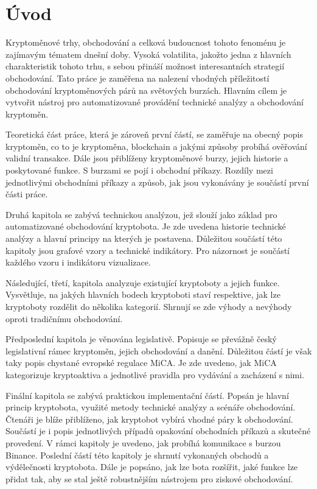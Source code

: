 \chapter{Úvod}
\label{sec:Introduction}
Kryptoměnové trhy, obchodování a celková budoucnost tohoto fenoménu je zajímavým tématem dnešní doby. Vysoká volatilita, jakožto jedna z hlavních charakteristik tohoto trhu, s sebou přináší
možnost interesantních strategií obchodování. Tato práce je zaměřena na nalezení vhodných příležitostí obchodování kryptoměnových párů na světových burzách. Hlavním cílem
je vytvořit nástroj pro automatizované provádění technické analýzy a obchodování kryptoměn.

Teoretická část práce, která je zároveň první částí, se zaměřuje na obecný popis kryptoměn, co to je kryptoměna, blockchain a jakými způsoby probíhá ověřování validní transakce. Dále jsou
přiblíženy kryptoměnové burzy, jejich historie a poskytované funkce. S burzami se pojí i obchodní příkazy. Rozdíly mezi jednotlivými obchodními příkazy a způsob, jak jsou vykonávány je
součástí první části práce.

Druhá kapitola se zabývá technickou analýzou, jež slouží jako základ pro automatizované obchodování kryptobota. Je zde uvedena historie technické analýzy a hlavní principy
na kterých je postavena. Důležitou součástí této kapitoly jsou grafové vzory a technické indikátory. Pro názornost je součástí každého vzoru i indikátoru vizualizace.

Následující, třetí, kapitola analyzuje existující kryptoboty a jejich funkce. Vysvětluje, na jakých hlavních bodech kryptoboti staví respektive, jak lze kryptoboty rozdělit do několika
kategorií. Shrnují se zde výhody a nevýhody oproti tradičnímu obchodování.

Předposlední kapitola je věnována legislativě. Popisuje se převážně český legislativní rámec kryptoměn, jejich obchodování a danění. Důležitou částí je však taky popis chystané evropské
regulace MiCA. Je zde uvedeno, jak MiCA kategorizuje kryptoaktiva a jednotlivé pravidla pro vydávání a zacházení s nimi.

Finální kapitola se zabývá praktickou implementační částí. Popsán je hlavní princip kryptobota, využité metody technické analýzy a scénáře obchodování. Čtenáři je blíže přiblíženo, jak
kryptobot vybírá vhodné páry k obchodování. Součástí je i popis jednotlivých případů opakování obchodních příkazů a skutečné provedení. V rámci kapitoly je uvedeno, jak probíhá komunikace
s burzou Binance. Poslední částí této kapitoly je shrnutí vykonaných obchodů a výdělečnosti kryptobota. Dále je popsáno, jak lze bota rozšířit, jaké funkce lze přidat tak, aby se stal ještě
robustnějším nástrojem pro ziskové obchodování.

\endinput